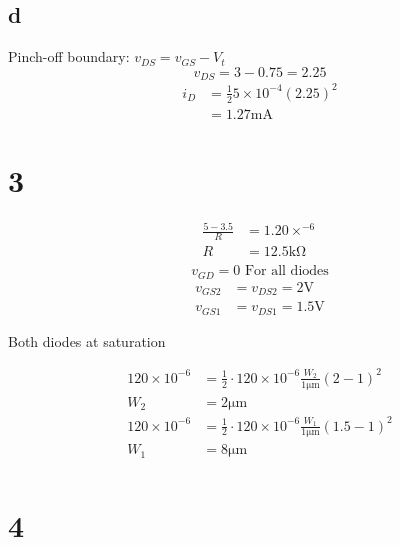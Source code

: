 \documentclass{article}
\begin{document}
\begin{multicols}{2}
    \subsection*{d}
    Pinch-off boundary: \(v_{DS} = v_{GS} - V_t\)
    \[
        v_{DS} = 3-0.75 = 2.25
    \]
    \begin{align*}
        i_D & = \frac{1}{2} 5\times 10^{-4} {\left(2.25\right)}^2 \\
            & = 1.27\si{\milli\ampere}
    \end{align*}
    \section*{3}
    \begin{align*}
        \frac{5-3.5}{R} & = 1.20\times ^{-6}   \\
        R               & = 12.5\si{\kilo\ohm} \\
    \end{align*}
    \[
        v_{GD} = 0 \text{ For all diodes}
    \]
    \begin{align*}
        v_{GS2} & =v_{DS2} = 2\si{\volt}   \\
        v_{GS1} & =v_{DS1} = 1.5\si{\volt}
    \end{align*}

    Both diodes at saturation

    \begin{align*}
        120\times 10^{-6} & = \frac{1}{2}
        \cdot 120\times 10^{-6} \frac{W_2}{1\si{\micro\meter}}{(2-1)}^2                                    \\
        W_2               & = 2\si{\micro\meter}                                                           \\
        120\times 10^{-6} & = \frac{1}{2}\cdot 120\times 10^{-6} \frac{W_1}{1\si{\micro\meter}}{(1.5-1)}^2 \\
        W_1               & = 8\si{\micro\meter}                                                           \\
    \end{align*}
    \section*{4}

\end{multicols}
\end{document}
